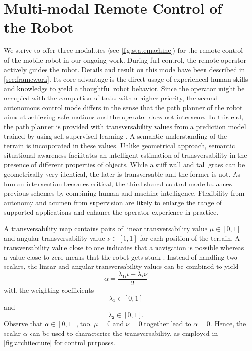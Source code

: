 \documentclass[letterpaper, 10 pt, conference]{ieeeconf}  %
\begin{document}
\section{Multi-modal Remote Control of the Robot}
We strive to offer three modalities (see \cref{fig:statemachine}) for the remote control of the mobile robot in our ongoing work. During  full control, the remote operator actively guides the robot. Details and result on this mode have been described in \cref{sec:framework}. Its core advantage is the direct usage of experienced human skills and knowledge to yield a thoughtful robot behavior. Since the operator might be occupied with the completion of  tasks with a higher priority, the second autonomous control mode differs  in the sense that the path planner of the robot aims at achieving safe motions and the operator does not intervene. To this end, the path planner is provided with transversability values from a prediction model trained by using self-supervised learning \cite{wayfaster}. A semantic understanding of the terrain  is incorporated in these values. Unlike geometrical approach, semantic situational awareness facilitates an intelligent estimation of transversability in the presence of  different properties of objects. While a stiff wall and tall grass can be geometrically very identical, the later is transversable and the former is not. As human intervention becomes critical, the third shared control mode balances previous schemes by combining human and machine intelligence. Flexibility from autonomy and acumen from supervision are likely to enlarge the range of supported applications and enhance the operator experience in practice.

A transversability map  contains pairs of linear transversability value $\mu \in [0,1]$  and angular transversability value $\nu\in [0,1]$ for each position of the terrain. A transversability value close to one indicates that a navigation is possible whereas a value close to zero means that the robot  gets stuck \cite{wayfast}. Instead of handling two scalars, the linear and angular transversability values can be combined to yield 
\begin{equation}
	\alpha = \frac{\lambda_1 \mu + \lambda_2 \nu}{2}
\end{equation}
with the weighting coefficients
\begin{equation}
	\lambda_1 \in [0,1]
\end{equation}
and 
\begin{equation}
	\lambda_2 \in [0,1].
\end{equation}
Observe that $\alpha \in [0,1]$, too. $\mu = 0$ and $\nu = 0$ together lead  to $\alpha = 0$. Hence, the scalar $\alpha$ can be used to characterize the transversability, as employed in 	\cref{fig:architecture} for control purposes.
\end{document}
